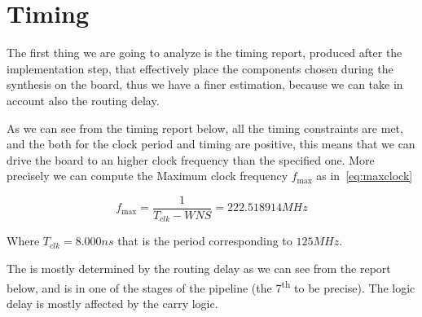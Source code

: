 \section{Timing}\label{sec:timing}

The first thing we are going to analyze is the timing report, produced after the
implementation step, that effectively place the components chosen during the
synthesis on the board, thus we have a finer estimation, because we can take in
account also the routing delay.

As we can see from the timing report below, all the timing constraints are met,
and the  both for the clock period and timing are positive, this
means that we can drive the board to an higher clock frequency than the
specified one. More precisely we can compute the Maximum clock frequency
\(f_{\max}\) as in~\eqref{eq:maxclock}

\begin{equation}\label{eq:maxclock}
	f_{\max} = \frac{1}{T_{clk} - WNS} = 222.518914 MHz
\end{equation}

Where \(T_{clk} = 8.000 ns\) that is the period corresponding to \(125 MHz\).

The  is mostly determined by the routing delay as we
can see from the report below, and is in one of the stages of the pipeline (the
7\textsuperscript{th} to be precise). The logic delay is mostly affected by the
carry logic.

